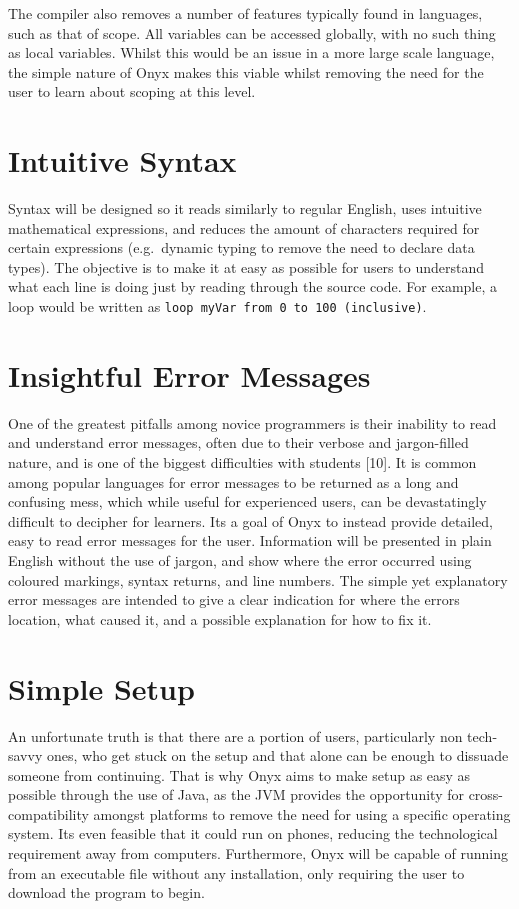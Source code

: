 \documentclass[
]{report}
\begin{document}
The compiler also removes a number of features typically found in
languages, such as that of scope. All variables can be accessed
globally, with no such thing as local variables. Whilst this would be an
issue in a more large scale language, the simple nature of Onyx makes
this viable whilst removing the need for the user to learn about scoping
at this level.

\section{Intuitive Syntax}
Syntax will be designed so it reads similarly to regular English, uses
intuitive mathematical expressions, and reduces the amount of characters
required for certain expressions (e.g.~dynamic typing to remove the need
to declare data types). The objective is to make it at easy as possible
for users to understand what each line is doing just by reading through
the source code. For example, a loop would be written as
\texttt{loop\ myVar\ from\ 0\ to\ 100\ (inclusive)}.

\section{Insightful Error Messages}
One of the greatest pitfalls among novice programmers is their inability
to read and understand error messages, often due to their verbose and
jargon-filled nature, and is one of the biggest difficulties with
students {[}10{]}. It is common among popular languages for error
messages to be returned as a long and confusing mess, which while useful
for experienced users, can be devastatingly difficult to decipher for
learners. Its a goal of Onyx to instead provide detailed, easy to read
error messages for the user. Information will be presented in plain
English without the use of jargon, and show where the error occurred
using coloured markings, syntax returns, and line numbers. The simple
yet explanatory error messages are intended to give a clear indication
for where the errors location, what caused it, and a possible
explanation for how to fix it.

\section{Simple Setup}
An unfortunate truth is that there are a portion of users, particularly
non tech-savvy ones, who get stuck on the setup and that alone can be
enough to dissuade someone from continuing. That is why Onyx aims to
make setup as easy as possible through the use of Java, as the JVM
provides the opportunity for cross-compatibility amongst platforms to
remove the need for using a specific operating system. Its even feasible
that it could run on phones, reducing the technological requirement away
from computers. Furthermore, Onyx will be capable of running from an
executable file without any installation, only requiring the user to
download the program to begin.
\end{document}
